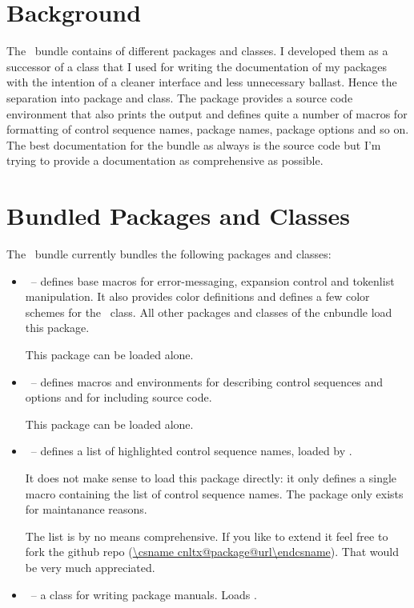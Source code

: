 \documentclass[load-preamble]{cnltx-doc}
\begin{document}
\section{Background}

The \cnltx\ bundle contains of different packages and classes.  I developed
them as a successor of a class that I used for writing the documentation of my
packages with the intention of a cleaner interface and less unnecessary
ballast.  Hence the separation into package and class.  The package provides a
source code environment that also prints the output and defines quite a number
of macros for formatting of control sequence names, package names, package
options and so on.  The best documentation for the bundle as always is the
source code but I'm trying to provide a documentation as comprehensive as
possible.

\section{Bundled Packages and Classes}

The \cnltx\ bundle currently bundles the following packages and classes:
\begin{itemize}
  \item \cnltxbase\ -- defines base macros for error-messaging, expansion
    control and tokenlist manipulation.  It also provides color definitions
    and defines a few color schemes for the \cnltxdoc\ class.  All other
    packages and classes of the cnbundle load this package.\par
    This package can be loaded alone.
  \item \cnltxexample\ -- defines macros and environments for describing
    control sequences and options and for including source code.\par
    This package can be loaded alone.
  \item \cnltxcsnames\ -- defines a list of highlighted control sequence
    names, loaded by \cnltxexample.\par
    It does not make sense to load this package directly: it only defines a
    single macro containing the list of control sequence names.  The package
    only exists for maintanance reasons.\par
    The list is by no means comprehensive.  If you like to extend it feel free
    to fork the github repo (\url{\csname cnltx@package@url\endcsname}).
    That would be very much appreciated.
  \item \cnltxdoc\ -- a class for writing package manuals.  Loads
    \cnltxexample.
\end{itemize}
\end{document}
